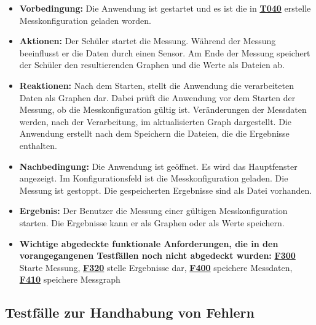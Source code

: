 \documentclass[parskip=full]{scrartcl}
\begin{document}
\begin{description}
\begin{itemize}
\item []\textbf{Vorbedingung:} Die Anwendung ist gestartet und es ist die in \hyperlink{link-t040}{\textbf{T040}} erstelle Messkonfiguration geladen worden.

\item []\textbf{Aktionen:} Der Schüler startet die Messung. Während der Messung beeinflusst er die Daten durch einen Sensor. Am Ende der Messung speichert der Schüler den resultierenden Graphen und die Werte als Dateien ab.
\item []\textbf{Reaktionen:} Nach dem Starten, stellt die Anwendung die verarbeiteten Daten als Graphen dar. Dabei prüft die Anwendung vor dem Starten der Messung, ob die Messkonfiguration gültig ist. Veränderungen der Messdaten werden, nach der Verarbeitung, im aktualisierten Graph dargestellt. Die Anwendung erstellt nach dem Speichern die Dateien, die die Ergebnisse enthalten.
\item []\textbf{Nachbedingung:}  Die Anwendung ist geöffnet. Es wird das Hauptfenster angezeigt. Im Konfigurationsfeld ist die Messkonfiguration geladen. Die Messung ist gestoppt. Die gespeicherten Ergebnisse sind als Datei vorhanden.


\item []\textbf{Ergebnis:} Der Benutzer die Messung einer gültigen Messkonfiguration starten. Die Ergebnisse kann er als Graphen oder als Werte speichern. 
\item []\textbf{Wichtige abgedeckte funktionale Anforderungen, die in den vorangegangenen Testfällen noch nicht abgedeckt wurden:} \hyperlink{link-f300}{\textbf{F300}} Starte Messung, \hyperlink{link-f320}{\textbf{F320}} stelle Ergebnisse dar, \hyperlink{link-f400}{\textbf{F400}} speichere Messdaten, \hyperlink{link-f410}{\textbf{F410}} speichere Messgraph


\end{itemize}
\end{description}

\subsection{Testfälle zur Handhabung von Fehlern}
\end{document}
